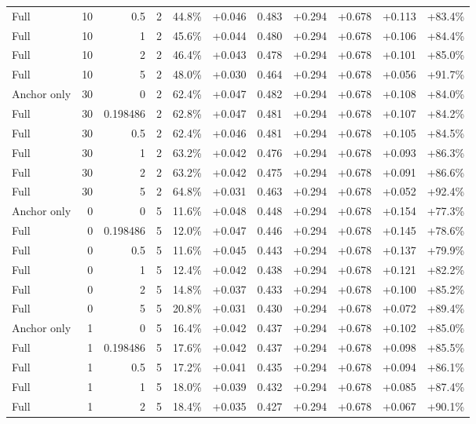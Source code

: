 \begin{table}[htbp]
\begin{tabular}{lrrrccccccc}
Full & 10 & 0.5 & 2 & 44.8\% & +0.046 & 0.483 & +0.294 & +0.678 & +0.113 & +83.4\% \\
Full & 10 & 1 & 2 & 45.6\% & +0.044 & 0.480 & +0.294 & +0.678 & +0.106 & +84.4\% \\
Full & 10 & 2 & 2 & 46.4\% & +0.043 & 0.478 & +0.294 & +0.678 & +0.101 & +85.0\% \\
Full & 10 & 5 & 2 & 48.0\% & +0.030 & 0.464 & +0.294 & +0.678 & +0.056 & +91.7\% \\
Anchor only & 30 & 0 & 2 & 62.4\% & +0.047 & 0.482 & +0.294 & +0.678 & +0.108 & +84.0\% \\
Full & 30 & 0.198486 & 2 & 62.8\% & +0.047 & 0.481 & +0.294 & +0.678 & +0.107 & +84.2\% \\
Full & 30 & 0.5 & 2 & 62.4\% & +0.046 & 0.481 & +0.294 & +0.678 & +0.105 & +84.5\% \\
Full & 30 & 1 & 2 & 63.2\% & +0.042 & 0.476 & +0.294 & +0.678 & +0.093 & +86.3\% \\
Full & 30 & 2 & 2 & 63.2\% & +0.042 & 0.475 & +0.294 & +0.678 & +0.091 & +86.6\% \\
Full & 30 & 5 & 2 & 64.8\% & +0.031 & 0.463 & +0.294 & +0.678 & +0.052 & +92.4\% \\
Anchor only & 0 & 0 & 5 & 11.6\% & +0.048 & 0.448 & +0.294 & +0.678 & +0.154 & +77.3\% \\
Full & 0 & 0.198486 & 5 & 12.0\% & +0.047 & 0.446 & +0.294 & +0.678 & +0.145 & +78.6\% \\
Full & 0 & 0.5 & 5 & 11.6\% & +0.045 & 0.443 & +0.294 & +0.678 & +0.137 & +79.9\% \\
Full & 0 & 1 & 5 & 12.4\% & +0.042 & 0.438 & +0.294 & +0.678 & +0.121 & +82.2\% \\
Full & 0 & 2 & 5 & 14.8\% & +0.037 & 0.433 & +0.294 & +0.678 & +0.100 & +85.2\% \\
Full & 0 & 5 & 5 & 20.8\% & +0.031 & 0.430 & +0.294 & +0.678 & +0.072 & +89.4\% \\
Anchor only & 1 & 0 & 5 & 16.4\% & +0.042 & 0.437 & +0.294 & +0.678 & +0.102 & +85.0\% \\
Full & 1 & 0.198486 & 5 & 17.6\% & +0.042 & 0.437 & +0.294 & +0.678 & +0.098 & +85.5\% \\
Full & 1 & 0.5 & 5 & 17.2\% & +0.041 & 0.435 & +0.294 & +0.678 & +0.094 & +86.1\% \\
Full & 1 & 1 & 5 & 18.0\% & +0.039 & 0.432 & +0.294 & +0.678 & +0.085 & +87.4\% \\
Full & 1 & 2 & 5 & 18.4\% & +0.035 & 0.427 & +0.294 & +0.678 & +0.067 & +90.1\% \\

\end{tabular}
\end{table}
